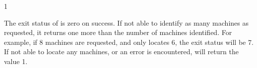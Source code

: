 \begin{ManPage}{\label{man-condor-findhost}}{1}
\ExitStatus

The exit status of  is zero on success.
If not able to identify as many machines as requested,
it returns one more than the number of machines identified.
For example, if 8 machines are requested, and 
only locates 6, the exit status will be 7.
If not able to locate any machines, or an error is encountered,
 will return the value 1.

\end{ManPage}


